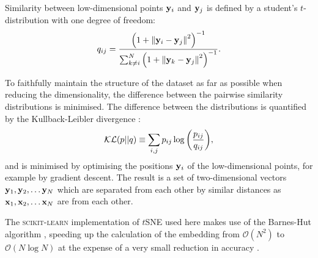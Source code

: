 \documentclass[fleqn,usenatbib]{mnras}
\def\xb{\vb{x}}
\def\yb{\vb{y}}
\begin{document}
Similarity between low-dimensional points $\yb_i$ and $\yb_j$ is defined by a student's $t$-distribution with one degree of freedom:
\begin{equation}
q_{ij}
= \frac{
    \qty(1 + \norm{\yb_i - \yb_j}^2)^{-1}
}{
    \sum_{k\neq i}^N
    \qty(1 + \norm{\yb_k - \yb_j}^2)^{-1}
}.
\end{equation}

To faithfully maintain the structure of the dataset as far as possible when reducing the dimensionality, the difference between the pairwise similarity distributions is minimised. The difference between the distributions is quantified by the Kullback-Leibler divergence \citep{kullbackleibler}:
\begin{equation}
\mathcal{KL}(p||q)
\equiv \sum_{i, j} p_{ij} \log \qty(
    \frac{p_{ij}}{q_{ij}}
),
\end{equation}
and is minimised by optimising the positions $\yb_i$ of the low-dimensional points, for example by gradient descent.
The result is a set of two-dimensional vectors $\yb_1, \yb_2, \dots \yb_N$ which are separated from each other by similar distances as $\xb_1, \xb_2, \dots \xb_N$ are from each other.

The \textsc{scikit-learn} implementation of $t$SNE used here \citep{sklearn} makes use of the Barnes-Hut algorithm \citep{barneshut}, speeding up the calculation of the embedding from $\mathcal{O}(N^2)$ to $\mathcal{O}(N\log N)$ at the expense of a very small reduction in accuracy \citep{vandermaaten14}.




\bsp	%
\label{lastpage}
\end{document}
